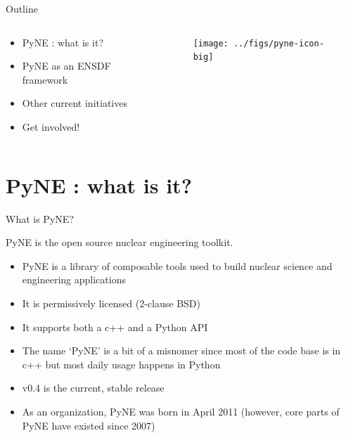 \documentclass[xcolor=x11names,compress]{beamer}
\renewcommand{\(}{\begin{columns}}
\renewcommand{\)}{\end{columns}}
\newcommand{\<}[1]{\begin{column}{#1}}
\renewcommand{\>}{\end{column}}
\begin{document}
\begin{frame}{Outline}

	\begin{columns}
  	\begin{column}{0.5\textwidth}
	    \begin{itemize}
          \item PyNE \cite{pyne}: what is it?
          \item PyNE as an ENSDF framework
          \item Other current initiatives
          \item Get involved!
	    \end{itemize}
  	\end{column}
 	\begin{column}{0.4\textwidth}
 	   \begin{center}
 	   \begin{figure}
       \texttt{[image: ../figs/pyne-icon-big]}
	   \end{figure}
 	   \end{center}
  	\end{column}
	\end{columns}

\end{frame}

\section{PyNE \cite{pyne}: what is it?}
\begin{frame}{What is PyNE?}

    PyNE is \textcolor{dgreen}{the} open source nuclear engineering toolkit.
    \vspace*{1em}
    \begin{itemize}
      \item PyNE is a \alert{library of composable tools} used to build
      nuclear science and engineering applications
      \item It is \alert{permissively licensed} (2-clause BSD)
      \item It supports both a \alert{c++} and a \alert{Python} API
      \item The name `PyNE' is a bit of a misnomer since most of the code
      base is in c++ but most daily usage happens in Python
      \item \alert{v0.4} is the current, stable release
      \item As an organization, PyNE was born in April 2011
      (however, core parts of PyNE have existed since 2007)
    \end{itemize}

\end{frame}
\end{document}
